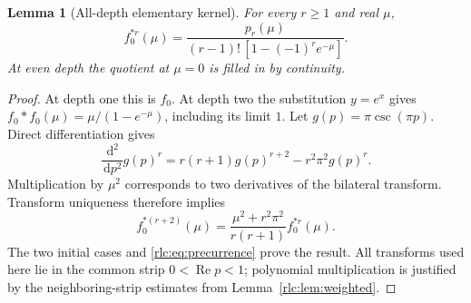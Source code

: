 \documentclass[11pt,a4paper]{article}
\numberwithin{equation}{section}
\newtheorem{lemma}[theorem]{Lemma}
\theoremstyle{definition}\newtheorem{definition}[theorem]{Definition}
\theoremstyle{remark}\newtheorem{remark}[theorem]{Remark}
\DeclareMathOperator{\Rea}{Re}
\newcommand{\dd}{\,\mathrm d}
\begin{document}
\begin{lemma}[All-depth elementary kernel]\label{rlc:lem:logistic}
For every $r\ge1$ and real $\mu$,
\begin{equation}\label{rlc:eq:logistic}
 f_0^{*r}(\mu)=
 \frac{p_r(\mu)}{(r-1)!\,[1-(-1)^r e^{-\mu}]}.
\end{equation}
At even depth the quotient at $\mu=0$ is filled in by continuity.
\end{lemma}
\begin{proof}
At depth one this is $f_0$. At depth two the substitution $y=e^x$
gives $f_0*f_0(\mu)=\mu/(1-e^{-\mu})$, including its limit $1$.
Let $g(p)=\pi\csc(\pi p)$. Direct differentiation gives
\[
 \frac{\dd^2}{\dd p^2}g(p)^r
  =r(r+1)g(p)^{r+2}-r^2\pi^2g(p)^r.
\]
Multiplication by $\mu^2$ corresponds to two derivatives of the
bilateral transform. Transform uniqueness therefore implies
\[
 f_0^{*(r+2)}(\mu)=
 \frac{\mu^2+r^2\pi^2}{r(r+1)}f_0^{*r}(\mu).
\]
The two initial cases and \eqref{rlc:eq:precurrence} prove the result.
All transforms used here lie in the common strip $0<\Rea p<1$;
polynomial multiplication is justified by the neighboring-strip
estimates from Lemma~\ref{rlc:lem:weighted}.
\end{proof}
\end{document}
